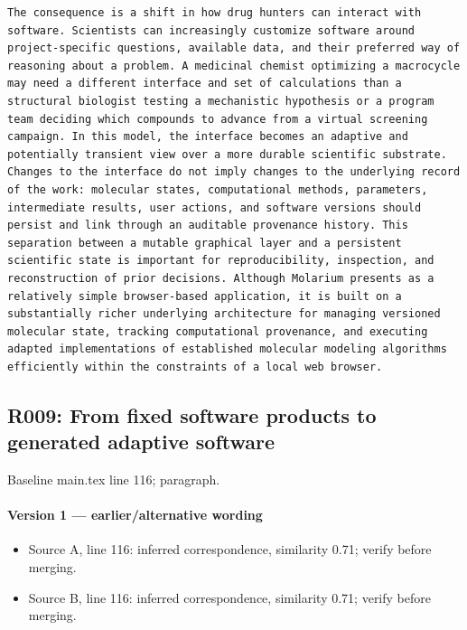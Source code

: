 \documentclass[11pt]{article}
\begin{document}
\begin{lstlisting}
The consequence is a shift in how drug hunters can interact with software. Scientists can increasingly customize software around project-specific questions, available data, and their preferred way of reasoning about a problem. A medicinal chemist optimizing a macrocycle may need a different interface and set of calculations than a structural biologist testing a mechanistic hypothesis or a program team deciding which compounds to advance from a virtual screening campaign. In this model, the interface becomes an adaptive and potentially transient view over a more durable scientific substrate. Changes to the interface do not imply changes to the underlying record of the work: molecular states, computational methods, parameters, intermediate results, user actions, and software versions should persist and link through an auditable provenance history. This separation between a mutable graphical layer and a persistent scientific state is important for reproducibility, inspection, and reconstruction of prior decisions. Although Molarium presents as a relatively simple browser-based application, it is built on a substantially richer underlying architecture for managing versioned molecular state, tracking computational provenance, and executing adapted implementations of established molecular modeling algorithms efficiently within the constraints of a local web browser.
\end{lstlisting}

\subsection{R009: From fixed software products to generated adaptive software}

Baseline main.tex line 116; paragraph.

\paragraph{Version 1 --- earlier/alternative wording}

\begin{itemize}[leftmargin=*]
\item Source A, line 116: inferred correspondence, similarity 0.71; verify before merging.
\item Source B, line 116: inferred correspondence, similarity 0.71; verify before merging.
\end{itemize}
\end{document}
